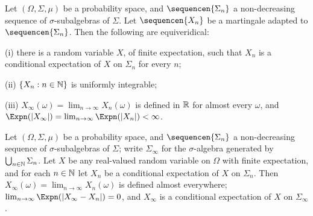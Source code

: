 Let $(\Omega,\Sigma,\mu)$ be a probability space, and
$\sequencen{\Sigma_n}$ a non-decreasing sequence of
$\sigma$-subalgebras of $\Sigma$.   Let $\sequencen{X_n}$ be a
martingale adapted to $\sequencen{\Sigma_n}$.   Then the following are
equiveridical:

\quad(i) there is a random variable $X$, of finite expectation, such
that $X_n$ is a conditional expectation of $X$ on $\Sigma_n$ for every
$n$;

\quad (ii) $\{X_n:n\in\Bbb N\}$ is uniformly integrable;

\quad (iii) $X_{\infty}(\omega)=\lim_{n\to\infty}X_n(\omega)$ is defined
in $\Bbb R$ for almost every $\omega$, and
$\Expn(|X_{\infty}|)=\lim_{n\to\infty}\Expn(|X_n|)<\infty$.


 Let $(\Omega,\Sigma,\mu)$ be a probability space,
and $\sequencen{\Sigma_n}$ a non-decreasing sequence of
$\sigma$-subalgebras of $\Sigma$;  write $\Sigma_{\infty}$ for the
$\sigma$-algebra generated by $\bigcup_{n\in\Bbb N}\Sigma_n$.   Let $X$
be any real-valued random variable on $\Omega$ with finite expectation,
and for each $n\in\Bbb N$ let $X_n$ be a conditional expectation of $X$
on $\Sigma_n$.   Then $X_{\infty}(\omega)=\lim_{n\to\infty}X_n(\omega)$
is defined almost everywhere;
$\lim_{n\to\infty}\Expn(|X_{\infty}-X_n|)=0$, and $X_{\infty}$ is a
conditional expectation of $X$ on $\Sigma_{\infty}$.

